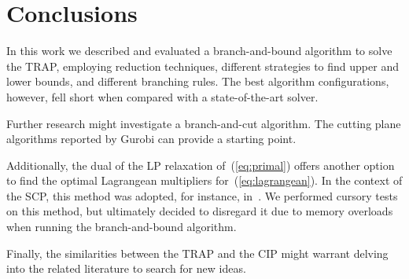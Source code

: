 \documentclass[runningheads]{llncs}
\begin{document}
\section{Conclusions}
\label{sec:conclusions}

In this work we described and evaluated a branch-and-bound algorithm to solve the TRAP, employing reduction techniques, different strategies to find upper and lower bounds, and different branching rules. The best algorithm configurations, however, fell short when compared with a state-of-the-art solver.

Further research might investigate a branch-and-cut algorithm. The cutting plane algorithms reported by Gurobi can provide a starting point.

Additionally, the dual of the LP relaxation of~(\ref{eq:primal}) offers another option to find the optimal Lagrangean multipliers for~(\ref{eq:lagrangean}). In the context of the SCP, this method was adopted, for instance, in~\cite{beasley-1987-algorithm,balas-ho-2009-set-covering}. We performed cursory tests on this method, but ultimately decided to disregard it due to memory overloads when running the branch-and-bound algorithm.

Finally, the similarities between the TRAP and the CIP might warrant delving into the related literature to search for new ideas. 



\end{document}
